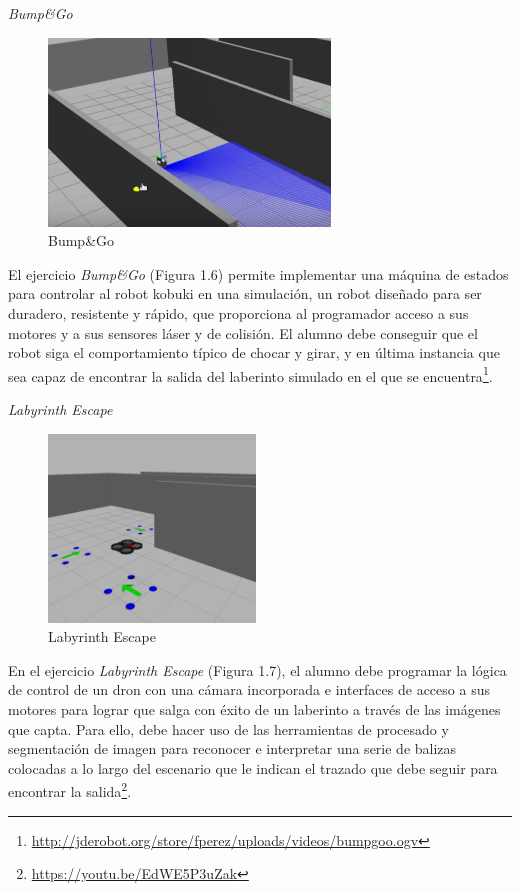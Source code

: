 \begin{multicols}{2}

\hspace{0.25\linewidth}
\textit{Bump\&Go}

\begin{figure}[H]
  \begin{center}
    \includegraphics[width=0.98\linewidth, height=5cm]{figures/bumpngo.png}
		\caption{Bump{\&}Go}
		\label{fig.bumpgo}
		\end{center}
\end{figure}

El ejercicio \textit{Bump\&Go} (Figura 1.6) permite implementar una máquina de estados para controlar al robot kobuki en una simulación, un robot diseñado para ser duradero, resistente y rápido, que proporciona al programador acceso a sus motores y a sus sensores láser y de colisión. El alumno debe conseguir que el robot siga el comportamiento típico de chocar y girar, y en última instancia que sea capaz de encontrar la salida del laberinto simulado en el que se encuentra\footnote{\url{http://jderobot.org/store/fperez/uploads/videos/bumpgoo.ogv}}.

\hspace{0.25\linewidth}
\textit{Labyrinth Escape}

\begin{figure}[H]
  \begin{center}
    \includegraphics[width=0.98\linewidth, height=5cm]{figures/labyrinth_escape.png}
		\caption{Labyrinth Escape}
		\label{fig.laby}
		\end{center}
\end{figure}

En el ejercicio \textit{Labyrinth Escape} (Figura 1.7), el alumno debe programar la lógica de control de un dron con una cámara incorporada e interfaces de acceso a sus motores para lograr que salga con éxito de un laberinto a través de las imágenes que capta. Para ello, debe hacer uso de las herramientas de procesado y segmentación de imagen para reconocer e interpretar una serie de balizas colocadas a lo largo del escenario que le indican el trazado que debe seguir para encontrar la salida\footnote{\url{https://youtu.be/EdWE5P3uZak}}.

\end{multicols}
